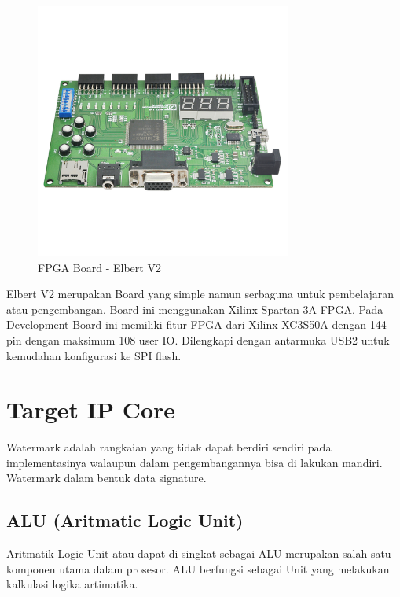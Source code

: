 \begin{figure}
	\centering
	\includegraphics[width=0.75\textwidth]
	{pics/elbertv2.jpg}
	\caption{FPGA Board - Elbert V2}
	\label{fig:fpga}
\end{figure}

Elbert V2 merupakan Board yang simple namun serbaguna untuk pembelajaran atau pengembangan. Board ini menggunakan Xilinx Spartan 3A FPGA. Pada Development Board ini memiliki fitur FPGA dari Xilinx XC3S50A dengan 144 pin dengan maksimum 108 user IO. Dilengkapi dengan antarmuka USB2 untuk kemudahan konfigurasi ke SPI flash. 

\section{Target IP Core}
Watermark adalah rangkaian yang tidak dapat berdiri sendiri pada implementasinya walaupun dalam pengembangannya bisa di lakukan mandiri. Watermark dalam bentuk data signature.

\subsection{ALU (Aritmatic Logic Unit)}
Aritmatik Logic Unit atau dapat di singkat sebagai ALU merupakan salah satu komponen utama dalam prosesor. ALU berfungsi sebagai Unit yang melakukan kalkulasi logika artimatika.
